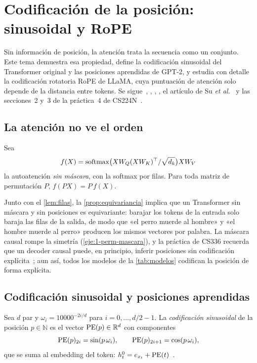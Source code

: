 \chapter{Codificación de la posición: sinusoidal y RoPE}
\label{tema:4}

Sin información de posición, la atención trata la secuencia como un conjunto. Este tema demuestra esa propiedad, define la codificación sinusoidal del Transformer original y las posiciones aprendidas de GPT-2, y estudia con detalle la codificación rotatoria RoPE de LLaMA, cuya puntuación de atención solo depende de la distancia entre tokens. Se sigue~\cite[§3.5]{vaswani}, \cite[§11.6.3]{d2l}, \cite[§12.1.9]{bishopdl}, \cite[§7.4]{jm3}, el artículo de Su \emph{et al.}~\cite[§3.2]{roformer} y las secciones~2 y~3 de la práctica~4 de CS224N~\cite{cs224n}.

\section{La atención no ve el orden}

\begin{proposicion}\label{prop:equivariancia}
Sea
\[
f(X)=\operatorname{softmax}\bigl(XW_Q(XW_K)^{\top}/\sqrt{d_k}\bigr)XW_V
\]
la autoatención \emph{sin máscara}, con la softmax por filas. Para toda matriz de permutación $P$, $f(PX)=P\,f(X)$.
\end{proposicion}

Junto con el \cref{lem:filas}, la \cref{prop:equivariancia} implica que un Transformer sin máscara y sin posiciones es equivariante: barajar los tokens de la entrada solo baraja las filas de la salida, de modo que «el perro muerde al hombre» y «el hombre muerde al perro» producen los mismos vectores por palabra. La máscara causal rompe la simetría (\cref{eje:1-perm-mascara}), y la práctica de CS336 recuerda que un decoder causal puede, en principio, inferir posiciones sin codificación explícita~\cite[§7.3]{cs336}; aun así, todos los modelos de la \cref{tab:modelos} codifican la posición de forma explícita.

\section{Codificación sinusoidal y posiciones aprendidas}

\begin{definicion}\label{def:sinusoidal}
Sea $d$ par y $\omega_i=10000^{-2i/d}$ para $i=0,\dots,d/2-1$. La \emph{codificación sinusoidal} de la posición $p\in\mathbb{N}$ es el vector $\operatorname{PE}(p)\in\mathbb{R}^{d}$ con componentes
\[
\operatorname{PE}(p)_{2i}=\sin(p\,\omega_i),\qquad \operatorname{PE}(p)_{2i+1}=\cos(p\,\omega_i),
\]
que se suma al embedding del token: $h^{0}_t=e_{x_t}+\operatorname{PE}(t)$~\cite[§3.5]{vaswani}.
\end{definicion}

